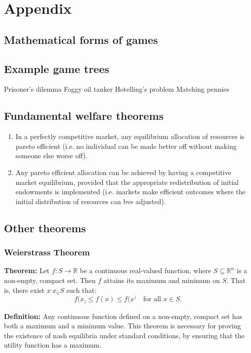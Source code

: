 \documentclass{article}
\begin{document}
\section{Appendix}

\subsection{Mathematical forms of games}

\subsection{Example game trees}
Prisoner's dilemma 
Foggy oil tanker 
Hotelling's problem 
Matching pennies 

\subsection{Fundamental welfare theorems}
\begin{enumerate}
    \item In a perfectly competitive market, any equilibrium allocation of resources is pareto efficient (i.e. no individual can be made better off without making someone else worse off).
    \item Any pareto efficient allocation can be achieved by having a competitive market equilibrium, provided that the appropriate redistribution of initial endowments is implemented (i.e. markets make efficient outcomes where the initial distribution of resources can bve adjusted). 
\end{enumerate}


\subsection{Other theorems}
\subsubsection{Weierstrass Theorem}\label{weiss}
\textbf{Theorem:} Let \(f: S \to \mathbb{R}\) be a continuous real-valued function, where \(S \subseteq \mathbb{R}^n\) is a non-empty, compact set. Then \(f\) attains its maximum and minimum on \(S\). That is, there exist \(x^, x_ \in S\) such that:
\[
f(x_) \leq f(x) \leq f(x^) \quad \text{for all } x \in S.
\]

\textbf{Definition:} Any continuous function defined on a non-empty, compact set has both a maximum and a minimum value. This theorem is necessary for proving the existence of nash equilibria under standard conditions, by ensuring that the utility function has a maximum. 
\end{document}

